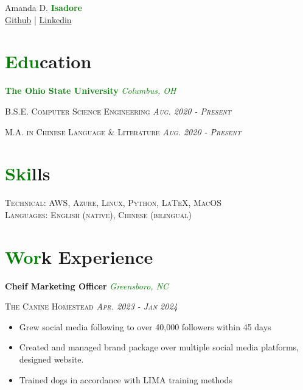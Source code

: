 \documentclass[11pt]{article}
\begin{document}
\begin{center}\Huge Amanda D. \textbf{\textcolor{green}{Isadore}}\\
\vspace{1mm}
\small \href{https://github.com/AdalineCooper}{Github} | \href{www.linkedin.com/in/aglingua}{Linkedin}
\end{center}

\section*{\textcolor{green}{Edu}cation}
\textbf{\textcolor{green}{The Ohio State University}} \hfill \textcolor{green}{\textit{Columbus, OH}}

\noindent \textsc{B.S.E. Computer Science Engineering \hfill {\textit{Aug. 2020 - Present}}}

\noindent \textsc{M.A. in Chinese Language \& Literature \hfill {\textit{Aug. 2020 - Present}}}

\section*{\textcolor{green}{Ski}lls}
\textsc{Technical: AWS, Azure, Linux, Python, \LaTeX, MacOS\\
Languages: English (native), Chinese (bilingual)}

\section*{\textcolor{green}{Wor}k Experience}

\noindent \textbf{Cheif Marketing Officer} \hfill \textcolor{green}{\textit{Greensboro, NC}}

\noindent \textsc{The Canine Homestead \hfill {\textit{Apr. 2023 - Jan 2024}}}
\vspace{-2mm}
\begin{itemize}
    \setlength{\itemsep}{0cm}
    \setlength{\parskip}{0cm}
    \addtolength{\leftskip}{-5mm}
    \item Grew social media following to over 40,000 followers within 45 days
    \item Created and managed brand package over multiple social media platforms, designed website.
    \item Trained dogs in accordance with LIMA training methods
\end{itemize}
\end{document}
